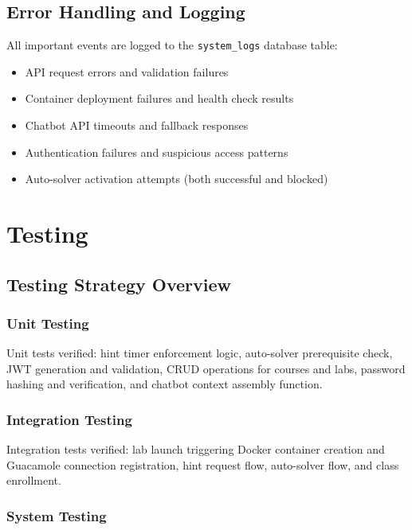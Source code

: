 \documentclass[12pt,a4paper]{report}
\begin{document}
\subsection{Error Handling and Logging}

All important events are logged to the \texttt{system\_logs} database table:
\begin{itemize}
  \item API request errors and validation failures
  \item Container deployment failures and health check results
  \item Chatbot API timeouts and fallback responses
  \item Authentication failures and suspicious access patterns
  \item Auto-solver activation attempts (both successful and blocked)
\end{itemize}

\section{Testing}

\subsection{Testing Strategy Overview}

\subsubsection{Unit Testing}

Unit tests verified: hint timer enforcement logic, auto-solver prerequisite check, JWT generation and
validation, CRUD operations for courses and labs, password hashing and verification, and chatbot
context assembly function.

\subsubsection{Integration Testing}

Integration tests verified: lab launch triggering Docker container creation and Guacamole connection
registration, hint request flow, auto-solver flow, and class enrollment.

\subsubsection{System Testing}
\end{document}
